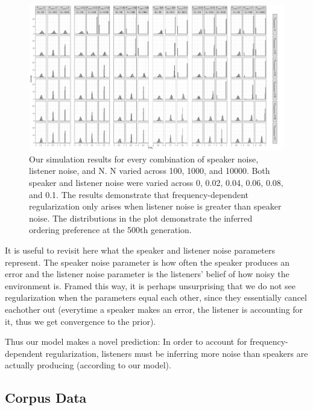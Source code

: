 \documentclass[10pt, letterpaper]{article}
\newenvironment{CodeChunk}{}{}
\begin{document}
\begin{CodeChunk}
\begin{figure}[tb]
\includegraphics[width=1\linewidth]{Figures/full_graph} \caption[Our simulation results for every combination of speaker noise, listener noise, and N]{Our simulation results for every combination of speaker noise, listener noise, and N. N varied across 100, 1000, and 10000. Both speaker and listener noise were varied across 0, 0.02, 0.04, 0.06, 0.08, and 0.1. The results demonstrate that frequency-dependent regularization only arises when listener noise is greater than speaker noise. The distributions in the plot demonstrate the inferred ordering preference at the 500th generation.}\label{fig:fullsimsplot}
\end{figure}
\end{CodeChunk}

It is useful to revisit here what the speaker and listener noise
parameters represent. The speaker noise parameter is how often the
speaker produces an error and the listener noise parameter is the
listeners' belief of how noisy the environment is. Framed this way, it
is perhaps unsurprising that we do not see regularization when the
parameters equal each other, since they essentially cancel eachother out
(everytime a speaker makes an error, the listener is accounting for it,
thus we get convergence to the prior).

Thus our model makes a novel prediction: In order to account for
frequency-dependent regularization, listeners must be inferring more
noise than speakers are actually producing (according to our model).

\hypertarget{corpus-data}{%
\subsection{Corpus Data}\label{corpus-data}}
\end{document}
